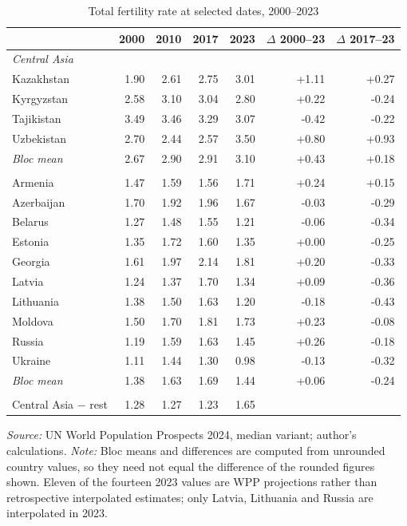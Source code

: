 \begin{table}[htbp]
\centering
\caption{Total fertility rate at selected dates, 2000--2023}
\label{tab:country-tfr}
\small
\begin{tabular}{lrrrrrr}
\toprule
 & 2000 & 2010 & 2017 & 2023 & $\Delta$ 2000--23 & $\Delta$ 2017--23 \\
\midrule
\multicolumn{7}{l}{\textit{Central Asia}} \\
\quad Kazakhstan & 1.90 & 2.61 & 2.75 & 3.01 & +1.11 & +0.27 \\
\quad Kyrgyzstan & 2.58 & 3.10 & 3.04 & 2.80 & +0.22 & -0.24 \\
\quad Tajikistan & 3.49 & 3.46 & 3.29 & 3.07 & -0.42 & -0.22 \\
\quad Uzbekistan & 2.70 & 2.44 & 2.57 & 3.50 & +0.80 & +0.93 \\
\addlinespace
\quad \textit{Bloc mean} & 2.67 & 2.90 & 2.91 & 3.10 & +0.43 & +0.18 \\
\addlinespace
\multicolumn{7}{l}{\textit{Rest of post-Soviet space}} \\
\quad Armenia & 1.47 & 1.59 & 1.56 & 1.71 & +0.24 & +0.15 \\
\quad Azerbaijan & 1.70 & 1.92 & 1.96 & 1.67 & -0.03 & -0.29 \\
\quad Belarus & 1.27 & 1.48 & 1.55 & 1.21 & -0.06 & -0.34 \\
\quad Estonia & 1.35 & 1.72 & 1.60 & 1.35 & +0.00 & -0.25 \\
\quad Georgia & 1.61 & 1.97 & 2.14 & 1.81 & +0.20 & -0.33 \\
\quad Latvia & 1.24 & 1.37 & 1.70 & 1.34 & +0.09 & -0.36 \\
\quad Lithuania & 1.38 & 1.50 & 1.63 & 1.20 & -0.18 & -0.43 \\
\quad Moldova & 1.50 & 1.70 & 1.81 & 1.73 & +0.23 & -0.08 \\
\quad Russia & 1.19 & 1.59 & 1.63 & 1.45 & +0.26 & -0.18 \\
\quad Ukraine & 1.11 & 1.44 & 1.30 & 0.98 & -0.13 & -0.32 \\
\addlinespace
\quad \textit{Bloc mean} & 1.38 & 1.63 & 1.69 & 1.44 & +0.06 & -0.24 \\
\addlinespace
\midrule
\multicolumn{7}{l}{Difference in bloc means} \\
\quad Central Asia $-$ rest & 1.28 & 1.27 & 1.23 & 1.65 & & \\
\bottomrule
\end{tabular}

\begin{minipage}{\textwidth}\footnotesize
\vspace{4pt}
\emph{Source:} UN World Population Prospects 2024, median variant; author's calculations.
\emph{Note:} Bloc means and differences are computed from unrounded country values,
so they need not equal the difference of the rounded figures shown. Eleven of the
fourteen 2023 values are WPP projections rather than retrospective interpolated
estimates; only Latvia, Lithuania and Russia are interpolated in 2023.
\end{minipage}
\end{table}